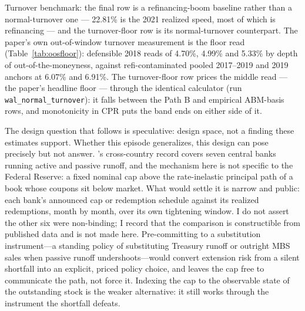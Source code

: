 \begin{table}[H]
\begin{threeparttable}
\begin{tablenotes}[flushleft]
\item Turnover benchmark: the final row is a refinancing-boom baseline rather than a normal-turnover one --- 22.81\% is the 2021 realized speed, most of which is refinancing --- and the turnover-floor row is its normal-turnover counterpart. The paper's own out-of-window turnover measurement is the floor read (Table~\ref{tab:oosfloor}): defensible 2018 reads of 4.70\%, 4.99\% and 5.33\% by depth of out-of-the-moneyness, against refi-contaminated pooled 2017--2019 and 2019 anchors at 6.07\% and 6.91\%. The turnover-floor row prices the middle read --- the paper's headline floor --- through the identical calculator (run \texttt{wal\_normal\_turnover}): it falls between the Path B and empirical ABM-basis rows, and monotonicity in CPR puts the band ends on either side of it.
\end{tablenotes}
\end{threeparttable}
\end{table}

The design question that follows is speculative: design space, not a finding these estimates support. Whether this episode generalizes, this design can pose precisely but not answer. \citet{du2024}'s cross-country record covers seven central banks running active and passive runoff, and the mechanism here is not specific to the Federal Reserve: a fixed nominal cap above the rate-inelastic principal path of a book whose coupons sit below market. What would settle it is narrow and public: each bank's announced cap or redemption schedule against its realized redemptions, month by month, over its own tightening window. I do not assert the other six were non-binding; I record that the comparison is constructible from published data and is not made here. Pre-committing to a substitution instrument---a standing policy of substituting Treasury runoff or outright MBS sales when passive runoff undershoots---would convert extension risk from a silent shortfall into an explicit, priced policy choice, and leaves the cap free to communicate the path, not force it. Indexing the cap to the observable state of the outstanding stock is the weaker alternative: it still works through the instrument the shortfall defeats.

